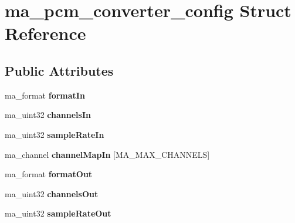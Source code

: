 \hypertarget{structma__pcm__converter__config}{}\section{ma\+\_\+pcm\+\_\+converter\+\_\+config Struct Reference}
\label{structma__pcm__converter__config}
\subsection*{Public Attributes}
\begin{DoxyCompactItemize}
\item 
\mbox{\label{structma__pcm__converter__config_a468ba6eaab94e940d256eb92ff5d7e49}} 
ma\+\_\+format {\bfseries format\+In}
\item 
\mbox{\label{structma__pcm__converter__config_a8a8827eee8de0fc8edc37e0ec203f7fd}} 
ma\+\_\+uint32 {\bfseries channels\+In}
\item 
\mbox{\label{structma__pcm__converter__config_afeb41704b998c8ce307e736f079f571d}} 
ma\+\_\+uint32 {\bfseries sample\+Rate\+In}
\item 
\mbox{\label{structma__pcm__converter__config_a2e247f9a96bf3f81773129c3168de4d4}} 
ma\+\_\+channel {\bfseries channel\+Map\+In} \mbox{[}M\+A\+\_\+\+M\+A\+X\+\_\+\+C\+H\+A\+N\+N\+E\+LS\mbox{]}
\item 
\mbox{\label{structma__pcm__converter__config_ad8612ea8f4d783c4e5ec0f956167c3a8}} 
ma\+\_\+format {\bfseries format\+Out}
\item 
\mbox{\label{structma__pcm__converter__config_a090988f7989d31ff678eca2f91e764eb}} 
ma\+\_\+uint32 {\bfseries channels\+Out}
\item 
\mbox{\label{structma__pcm__converter__config_a0534ec5ac31eef51b3dc447f648e48aa}} 
ma\+\_\+uint32 {\bfseries sample\+Rate\+Out}
\item 
\mbox{\label{structma__pcm__converter__config_a1e0c0f9ebeea62282d4510a263474fbf}} 

\end{DoxyCompactItemize}
